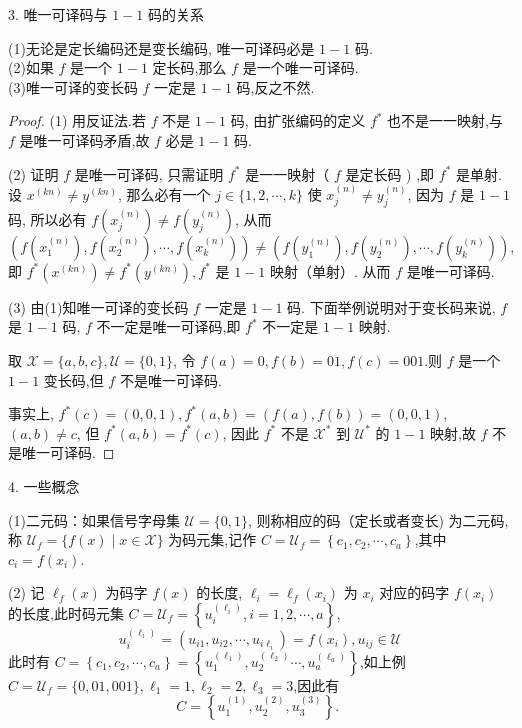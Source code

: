 3. 唯一可译码与 $ 1-1 $ 码的关系
\begin{theorem}
 (1)无论是定长编码还是变长编码, 唯一可译码必是 $ 1-1 $ 码.\\
(2)如果 $ f $ 是一个 $ 1-1 $ 定长码,那么 $ f $ 是一个唯一可译码.\\
(3)唯一可译的变长码 $ f $ 一定是 $ 1-1 $ 码,反之不然.
\end{theorem}
\begin{proof}
    (1) 用反证法.若 $ f $ 不是 $ 1-1 $ 码, 由扩张编码的定义 $ f^{*} $ 也不是一一映射,与 $ f $ 是唯一可译码矛盾,故 $ f $ 必是 $ 1-1 $ 码.

(2) 证明 $ f $ 是唯一可译码, 只需证明 $ f^{*} $ 是一一映射（ $ f $ 是定长码 ) ,即 $ f^{*} $ 是单射.设 $ x^{(k n)} \neq y^{(k n)} $, 那么必有一个 $ j \in\{1,2, \cdots, k\} $ 使 $ x_{j}^{(n)} \neq y_{j}^{(n)} $, 因为 $ f $ 是 $ 1-1 $ 码, 所以必有 $ f\left(x_{j}^{(n)}\right) \neq f\left(y_{j}^{(n)}\right) $, 从而
$$
\left(f\left(x_{1}^{(n)}\right), f\left(x_{2}^{(n)}\right), \cdots, f\left(x_{k}^{(n)}\right)\right) \neq\left(f\left(y_{1}^{(n)}\right), f\left(y_{2}^{(n)}\right), \cdots, f\left(y_{k}^{(n)}\right)\right),
$$
即 $ f^{*}\left(x^{(k n)}\right) \neq f^{*}\left(y^{(k n)}\right), f^{*} $ 是 $ 1-1 $ 映射（单射）. 从而 $ f $ 是唯一可译码.

(3) 由(1)知唯一可译的变长码 $ f $ 一定是 $ 1-1 $ 码. 下面举例说明对于变长码来说, $ f $ 是 $ 1-1 $ 码, $ f $ 不一定是唯一可译码,即 $ f^{*} $ 不一定是 $ 1-1 $ 映射.

取 $ \mathscr{X}=\{a, b, c\}, \mathscr{U}=\{0,1\} $, 令 $ f(a)=0, f(b)=01, f(c)=001 $.则 $ f $ 是一个 $ 1-1 $ 变长码,但 $ f $ 不是唯一可译码.

事实上, $ f^{*}(c)=(0,0,1), f^{*}(a, b)=(f(a), f(b))=(0,0,1) $, $ (a, b) \neq c $, 但 $ f^{*}(a, b)=f^{*}(c) $, 因此 $ f^{*} $ 不是 $ \mathscr{X}^{*} $ 到 $ \mathscr{U}^{*} $ 的 $ 1-1 $ 映射,故 $ f $ 不是唯一可译码.
\end{proof}

4. 一些概念

(1)二元码：如果信号字母集 $ \mathscr{U}=\{0,1\} $, 则称相应的码（定长或者变长) 为二元码,称 $ \mathscr{U}_f=\{f(x) \mid x \in \mathscr{X}\} $ 为码元集,记作 $ C=\mathscr{U}_{f}=\left\{c_{1}, c_{2}, \cdots, c_{a}\right\} $,其中 $ c_{i}=f\left(x_{i}\right) $.

(2) 记 $ \ell_{f}(x) $ 为码字 $ f(x) $ 的长度, $ \ell_{i}=\ell_{f}\left(x_{i}\right) $ 为 $ x_{i} $ 对应的码字 $ f\left(x_{i}\right) $ 的长度,此时码元集 $ C=\mathscr{U}_{f}=\left\{u_{i}^{\left(\ell_{i}\right)}, i=1,2, \cdots, a\right\} $,
$$
u_{i}^{\left(\ell_{i}\right)}=\left(u_{i 1}, u_{i 2}, \cdots, u_{i \ell_{i}}\right)=f\left(x_{i}\right), u_{i j} \in \mathscr{U}
$$
此时有 $ C=\left\{c_{1}, c_{2}, \cdots, c_{a}\right\}=\left\{u_{1}^{\left(\ell_{1}\right)}, u_{2}^{\left(\ell_{2}\right)} \cdots, u_{a}^{\left(\ell_{a}\right)}\right\} $,如上例 $ C=\mathscr{U}_{f}=\{0,01,001\}, \ell_{1}=1, \ell_{2}=2, \ell_{3}=3 $,因此有
$$
C=\left\{u_{1}^{(1)}, u_{2}^{(2)}, u_{3}^{(3)}\right\} \text {. }
$$

